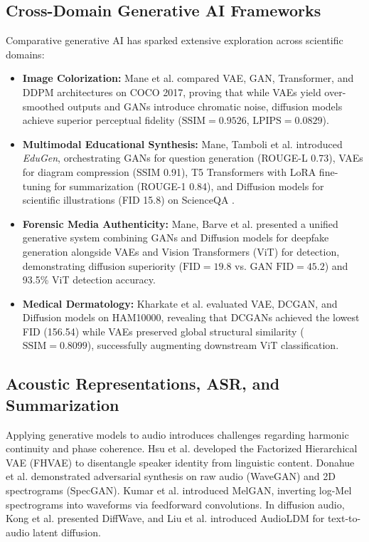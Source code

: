 \documentclass[conference]{IEEEtran}
\begin{document}
\subsection{Cross-Domain Generative AI Frameworks}
Comparative generative AI has sparked extensive exploration across scientific domains:
\begin{itemize}
    \item \textbf{Image Colorization:} Mane et al. \cite{mane2026colorization} compared VAE, GAN, Transformer, and DDPM architectures on COCO 2017, proving that while VAEs yield over-smoothed outputs and GANs introduce chromatic noise, diffusion models achieve superior perceptual fidelity ($\text{SSIM} = 0.9526$, $\text{LPIPS} = 0.0829$).
    \item \textbf{Multimodal Educational Synthesis:} Mane, Tamboli et al. \cite{mane2026edugen} introduced \textit{EduGen}, orchestrating GANs for question generation (ROUGE-L 0.73), VAEs for diagram compression (SSIM 0.91), T5 Transformers with LoRA fine-tuning for summarization (ROUGE-1 0.84), and Diffusion models for scientific illustrations (FID 15.8) on ScienceQA \cite{lu2022learn}.
    \item \textbf{Forensic Media Authenticity:} Mane, Barve et al. \cite{mane2026deepfake} presented a unified generative system combining GANs and Diffusion models for deepfake generation alongside VAEs and Vision Transformers (ViT) for detection, demonstrating diffusion superiority ($\text{FID} = 19.8$ vs. GAN $\text{FID} = 45.2$) and 93.5\% ViT detection accuracy.
    \item \textbf{Medical Dermatology:} Kharkate et al. \cite{kharkate2026skin} evaluated VAE, DCGAN, and Diffusion models on HAM10000, revealing that DCGANs achieved the lowest FID (156.54) while VAEs preserved global structural similarity ($\text{SSIM} = 0.8099$), successfully augmenting downstream ViT classification.
\end{itemize}

\subsection{Acoustic Representations, ASR, and Summarization}
Applying generative models to audio introduces challenges regarding harmonic continuity and phase coherence. Hsu et al. \cite{hsu2017fhvae} developed the Factorized Hierarchical VAE (FHVAE) to disentangle speaker identity from linguistic content. Donahue et al. \cite{donahue2019wavegan} demonstrated adversarial synthesis on raw audio (WaveGAN) and 2D spectrograms (SpecGAN). Kumar et al. \cite{kumar2019melgan} introduced MelGAN, inverting log-Mel spectrograms into waveforms via feedforward convolutions. In diffusion audio, Kong et al. \cite{kong2021diffwave} presented DiffWave, and Liu et al. \cite{liu2023audioldm} introduced AudioLDM for text-to-audio latent diffusion.
\end{document}
